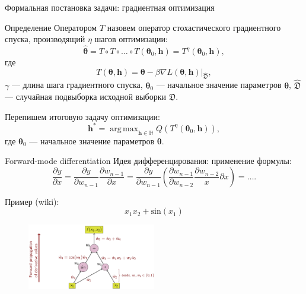 \documentclass[10pt,pdf,utf8,russian,aspectratio=169]{beamer}
\DeclareMathOperator*{\argmax}{arg\,max}
\begin{document}
\begin{frame}{Формальная постановка задачи: градиентная оптимизация}
\begin{block}{Определение}
Оператором $T$ назовем оператор стохастического градиентного спуска, производящий $\eta$ шагов оптимизации:
\begin{equation}
\label{eq:gd}
	 \hat{\boldsymbol{\theta}} = T \circ T \circ \dots \circ T(\boldsymbol{\theta}_0, \mathbf{h}) = T^\eta(\boldsymbol{\theta}_0, \mathbf{h}),
\end{equation}
где 
$$
	T(\boldsymbol{\theta}, \mathbf{h}) =\boldsymbol{\theta} - \beta \nabla L(\boldsymbol{\theta}, \mathbf{h})|_{\hat{\mathfrak{D}}}, 
$$
$\gamma$ --- длина шага градиентного спуска, $\boldsymbol{\theta}_0$ --- начальное значение параметров $\boldsymbol{\theta}$, $\hat{\mathfrak{D}}$ --- случайная подвыборка исходной выборки $\mathfrak{D}$.
\end{block}


Перепишем итоговую задачу оптимизации:
\[
	{\mathbf{h}}^{*} = \argmax_{\mathbf{h} \in \mathbb{H}} Q( T^\eta(\boldsymbol{\theta}_0, \mathbf{h})),
\]
где $\boldsymbol{\theta}_0$ --- начальное значение параметров $\boldsymbol{\theta}$.


\end{frame}

\begin{frame}{Forward-mode differentiation}
Идея дифференцирования: применение формулы:
\[
    \frac{\partial{y}}{\partial{x}}  = \frac{\partial{y}}{\partial{w_{n-1}}}\frac{\partial{w_{n-1}}}{\partial{x}} = \frac{\partial{y}}{\partial{w_{n-1}}}\left(\frac{\partial{w_{n-1}}}{\partial{w_{n-2}}}\frac{\partial{w_{n-2}}}x{\partial{x}}\right) = \dots. 
\]

Пример (wiki):
\[
x_1x_2 + \text{sin}(x_1)
\]
\begin{figure}
\centering
\includegraphics[width=0.5\textwidth]{fwd.png}
\end{figure}
\end{frame}
\end{document}
